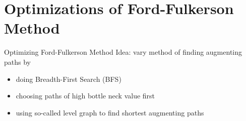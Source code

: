 \documentclass[aspectratio=169,c]{beamer} %
\begin{document}
\section{Optimizations of Ford-Fulkerson Method}
\begin{frame}{Optimizing Ford-Fulkerson Method}
    Idea: vary method of finding augmenting paths by
    \begin{itemize}
        \item doing Breadth-First Search (BFS)
        \item choosing paths of high bottle neck value first
        \item using so-called level graph to find shortest augmenting paths 
    \end{itemize}
\end{frame}
\end{document}
